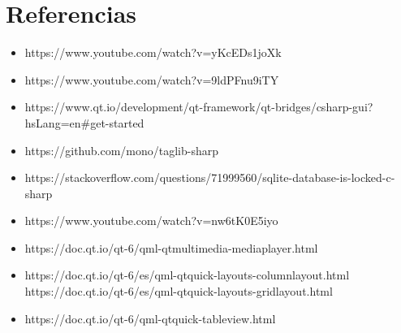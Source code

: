 \documentclass[10pt,letterpaper]{report}
\begin{document}
    \chapter{Referencias}

    \begin{itemize}
        \item [-] https://www.youtube.com/watch?v=yKcEDs1joXk
        \item [-] https://www.youtube.com/watch?v=9ldPFnu9iTY
        \item [-] https://www.qt.io/development/qt-framework/qt-bridges/csharp-gui?hsLang=en\#get-started
        \item[-] https://github.com/mono/taglib-sharp 
        \item [-] https://stackoverflow.com/questions/71999560/sqlite-database-is-locked-c-sharp
        \item [-]https://www.youtube.com/watch?v=nw6tK0E5iyo
        \item [-] https://doc.qt.io/qt-6/qml-qtmultimedia-mediaplayer.html
        \item [-] https://doc.qt.io/qt-6/es/qml-qtquick-layouts-columnlayout.html
        https://doc.qt.io/qt-6/es/qml-qtquick-layouts-gridlayout.html
        \item [-] https://doc.qt.io/qt-6/qml-qtquick-tableview.html
        
    \end{itemize}
\newpage



\vspace{1cm}
\end{document}
